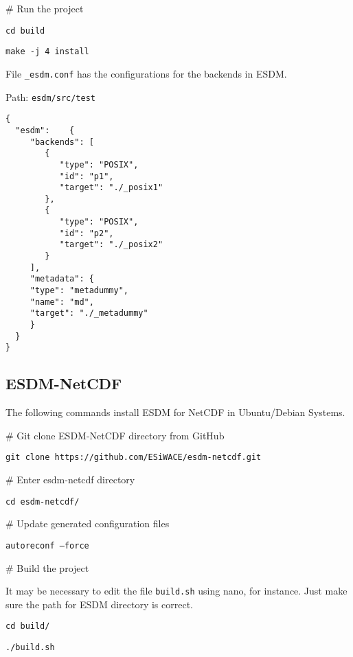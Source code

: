 \begin{framed}

\# Run the project

\texttt{cd build}

\texttt{make -j 4 install}

\end{framed}

File \texttt{\_esdm.conf} has the configurations for the backends in ESDM.

\begin{framed}

Path: \texttt{esdm/src/test}

\begin{verbatim}
{
  "esdm":    {
     "backends": [
        {
           "type": "POSIX",
           "id": "p1",
           "target": "./_posix1"
        },
        {
           "type": "POSIX",
           "id": "p2",
           "target": "./_posix2"
        }
     ],
     "metadata": {
     "type": "metadummy",
     "name": "md",
     "target": "./_metadummy"
     }
  }
}
\end{verbatim}

\end{framed}

\subsection{ESDM-NetCDF}
\label{doc:esdm-netcdf}

\tab
The following commands install ESDM for NetCDF in Ubuntu/Debian Systems.

\begin{framed}

\# Git clone ESDM-NetCDF directory from GitHub

\texttt{git clone https://github.com/ESiWACE/esdm-netcdf.git}

\# Enter esdm-netcdf directory

\texttt{cd esdm-netcdf/}

\# Update generated configuration files

\texttt{autoreconf --force}

\end{framed}

\begin{framed}

\# Build the project

It may be necessary to edit the file \texttt{build.sh} using nano, for instance. Just make sure the path for ESDM directory is correct.

\texttt{cd build/}

\texttt{./build.sh}

\end{framed}

